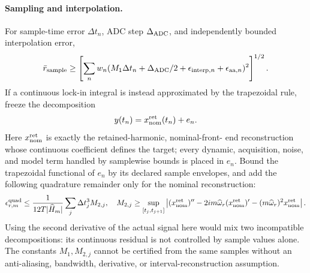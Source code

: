 \documentclass[11pt]{article}
\theoremstyle{definition}
\theoremstyle{remark}
\begin{document}
\paragraph{Sampling and interpolation.}
For sample-time error \(\Delta t_n\), ADC step \(\Delta_{\rm ADC}\), and
independently bounded interpolation error,
\[
 \bar r_{\rm sample}\ge
 \left[\sum_nw_n
 (M_1\Delta t_n+\Delta_{\rm ADC}/2+\epsilon_{{\rm interp},n}
  +\epsilon_{{\rm aa},n})^2
 \right]^{1/2}.
\]
If a continuous lock-in integral is instead approximated by the trapezoidal
rule, freeze the decomposition
\[
 y(t_n)=x_{\rm nom}^{\rm ret}(t_n)+e_n.
\]
Here \(x_{\rm nom}^{\rm ret}\) is exactly the retained-harmonic, nominal-front-
end reconstruction whose continuous coefficient defines the target; every
dynamic, acquisition, noise, and model term handled by samplewise bounds is
placed in \(e_n\).  Bound the trapezoidal functional of \(e_n\) by its declared
sample envelopes, and add the following quadrature remainder only for the
nominal reconstruction:
\[
 \epsilon^{\rm quad}_{r,m}\le
 \frac{1}{12T|\widehat H_m|}\sum_j\Delta t_j^3M_{2,j},
 \quad
 M_{2,j}\ge\sup_{[t_j,t_{j+1}]}
 \left|(x_{\rm nom}^{\rm ret})''
 -2im\widehat\omega_r(x_{\rm nom}^{\rm ret})'
 -(m\widehat\omega_r)^2x_{\rm nom}^{\rm ret}\right|.
\]
Using the second derivative of the actual signal here would mix two
incompatible decompositions: its continuous residual is not controlled by
sample values alone.  The constants \(M_1,M_{2,j}\) cannot be certified from the same samples
without an anti-aliasing, bandwidth, derivative, or interval-reconstruction
assumption.
\end{document}
